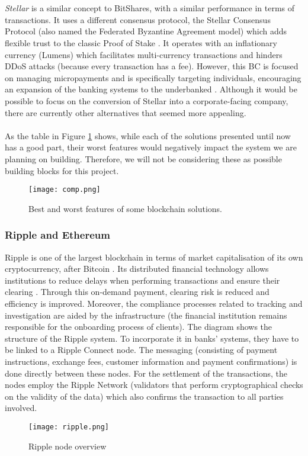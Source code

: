 \documentclass[12pt,twoside]{article}
\begin{document}
\\ \\
\textit{Stellar} is a similar concept to BitShares, with a similar performance in terms of transactions. It uses a different consensus protocol, the Stellar Consensus Protocol (also named the Federated Byzantine Agreement model) which adds flexible trust to the classic Proof of Stake \cite{Stellar:TP}. It operates with an inflationary currency (Lumens) which facilitates multi-currency transactions and hinders DDoS attacks (because every transaction has a fee). However, this BC is focused on managing micropayments and is specifically targeting individuals, encouraging an expansion of the banking systems to the underbanked \cite{Stellar:docs}. Although it would be possible to focus on the conversion of Stellar into a corporate-facing company, there are currently other alternatives that seemed more appealing.
\\ \\
As the table in Figure \ref{fig:comparison} shows, while each of the solutions presented until now has a good part, their worst features would negatively impact the system we are planning on building. Therefore, we will not be considering these as possible building blocks for this project.
\begin{figure}[H]
\centering
\texttt{[image: comp.png]}
\centering
\caption{Best and worst features of some blockchain solutions.}
\label{fig:comparison}
\end{figure}

\subsubsection{Ripple and Ethereum}
\label{sub:Ripple}
Ripple is one of the largest blockchain in terms of market capitalisation of its own cryptocurrency, after Bitcoin \cite{bitcoindominance}. Its distributed financial technology allows institutions to reduce delays when performing transactions and ensure their clearing \cite{Ripple:TP}. Through this on-demand payment, clearing risk is reduced and efficiency is improved. Moreover, the compliance processes related to tracking and investigation are aided by the infrastructure (the financial institution remains responsible for the onboarding process of clients). The diagram shows the structure of the Ripple system. To incorporate it in banks' systems, they have to be linked to a Ripple Connect node. The messaging (consisting of payment instructions, exchange fees, customer information and payment confirmations) is done directly between these nodes. For the settlement of the transactions, the nodes employ the Ripple Network (validators that perform cryptographical checks on the validity of the data) which also confirms the transaction to all parties involved.
\begin{figure}[H]
\centering
\texttt{[image: ripple.png]}
\caption{Ripple node overview \cite{Ripple:TP}}
\centering
\label{fig:Ripple}
\end{figure}
\end{document}
